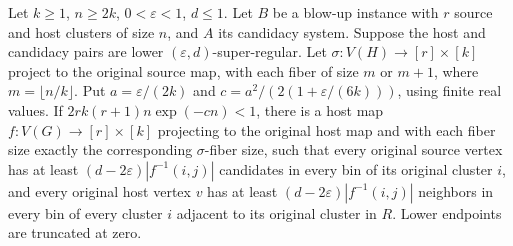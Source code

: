 \begin{lemma}
Let $k\geq1$, $n\geq2k$, $0<\varepsilon<1$, $d\leq1$.
Let $B$ be a blow-up instance with $r$ source and host clusters of
size $n$, and $A$ its candidacy system. Suppose the host and candidacy
pairs are lower $(\varepsilon,d)$-super-regular. Let
$\sigma:V(H)\to[r]\times[k]$ project to the original source map,
with each fiber of size $m$ or $m+1$, where $m=\lfloor n/k\rfloor$.
Put $a=\varepsilon/(2k)$ and
$c=a^2/(2(1+\varepsilon/(6k)))$, using finite real values.
If $2rk(r+1)n\exp(-cn)<1$, there is a host map
$f:V(G)\to[r]\times[k]$ projecting to the original host map and
with each fiber size exactly the corresponding $\sigma$-fiber size,
such that every original source vertex has at least
$(d-2\varepsilon)|f^{-1}(i,j)|$ candidates in every bin of its
original cluster $i$, and every original host vertex $v$ has at least
$(d-2\varepsilon)|f^{-1}(i,j)|$ neighbors in every bin of every
cluster $i$ adjacent to its original cluster in $R$.
Lower endpoints are truncated at zero.
\end{lemma}
